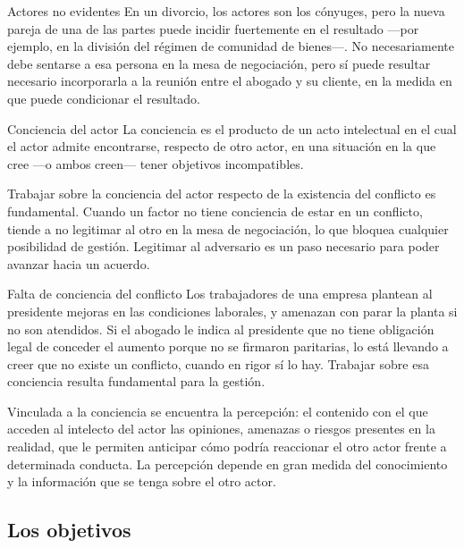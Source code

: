 \documentclass[12pt,oneside]{book}
\begin{document}
\begin{example}{Actores no evidentes}
En un divorcio, los actores son los cónyuges, pero la nueva pareja de una de las partes puede incidir fuertemente en el resultado ---por ejemplo, en la división del régimen de comunidad de bienes---. No necesariamente debe sentarse a esa persona en la mesa de negociación, pero sí puede resultar necesario incorporarla a la reunión entre el abogado y su cliente, en la medida en que puede condicionar el resultado.
\end{example}

\begin{definition}{Conciencia del actor}
La conciencia es el producto de un acto intelectual en el cual el actor admite encontrarse, respecto de otro actor, en una situación en la que cree ---o ambos creen--- tener objetivos incompatibles.
\end{definition}

\begin{important}
Trabajar sobre la conciencia del actor respecto de la existencia del conflicto es fundamental. Cuando un factor no tiene conciencia de estar en un conflicto, tiende a no legitimar al otro en la mesa de negociación, lo que bloquea cualquier posibilidad de gestión. Legitimar al adversario es un paso necesario para poder avanzar hacia un acuerdo.
\end{important}

\begin{example}{Falta de conciencia del conflicto}
Los trabajadores de una empresa plantean al presidente mejoras en las condiciones laborales, y amenazan con parar la planta si no son atendidos. Si el abogado le indica al presidente que no tiene obligación legal de conceder el aumento porque no se firmaron paritarias, lo está llevando a creer que no existe un conflicto, cuando en rigor sí lo hay. Trabajar sobre esa conciencia resulta fundamental para la gestión.
\end{example}

Vinculada a la conciencia se encuentra la percepción: el contenido con el que acceden al intelecto del actor las opiniones, amenazas o riesgos presentes en la realidad, que le permiten anticipar cómo podría reaccionar el otro actor frente a determinada conducta. La percepción depende en gran medida del conocimiento y la información que se tenga sobre el otro actor.

\subsection{Los objetivos}
\end{document}
